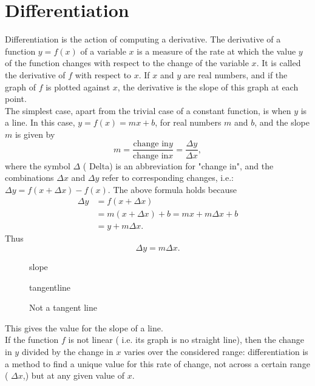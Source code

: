 \section{Differentiation}
Differentiation is the action of computing a derivative. The derivative of a function $y = f ( x)$ of a variable $x $ is a measure of the rate at which the value $y$ of the function changes with respect to the change of the variable $x$. It is called the derivative of $f$ with respect to $x$. If $x$ and $y$ are real numbers, and if the graph of $f$ is plotted against $x$, the derivative is the slope of this graph at each point.\\

The simplest case, apart from the trivial case of a constant function, is when $y $ is a line. In this case, $y = f ( x) = mx +b$, for real numbers $m$ and $b$, and the slope $m $ is given by
\[ 
	m = \frac{\text{change in}y}{\text{change in}x} = \frac{\Delta y}{\Delta x},
\]
where the symbol $\Delta$ ( Delta) is an abbreviation for "change in", and the combinations $\Delta x$ and $\Delta y$ refer to corresponding changes, i.e.: $\Delta y = f ( x + \Delta x) - f ( x)$. The above formula holds because
\begin{align*}
	\Delta y &= f ( x + \Delta x)\\
&= m ( x + \Delta x) + b = mx + m\Delta x + b\\
&= y + m \Delta x.
\end{align*}
Thus
\[ 
\Delta y = m \Delta x.
\]
\begin{figure}[ht]
    \centering
    \caption{slope}
    \label{fig:slope}
\end{figure}

\begin{figure}[ht]
    \centering
    \caption{tangentline}
    \label{fig:tangentline}
\end{figure}
\begin{figure}[ht]
    \centering
    \caption{Not a tangent line}
    \label{fig:not-a-tangent-line}
\end{figure}
This gives the value for the slope of a line.\\

If the function $f$ is not linear ( i.e. its graph is no straight line), then the change in $y$ divided by the change in $x$ varies over the considered range: differentiation is a method to find a unique value for this rate of change, not across a certain range ( $\Delta x$,) but at any given value of $x$.

